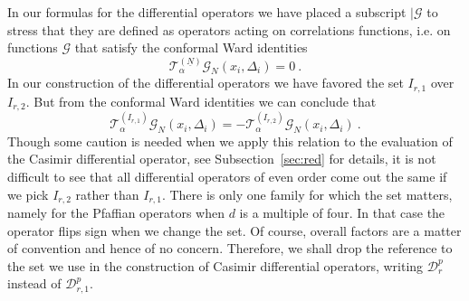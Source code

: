 \documentclass{article}
\def\cG{\mathcal{G}}
\begin{document}
In our formulas for the differential operators we have placed a subscript $|\cG$ to stress 
that they are defined as operators acting on correlations functions, i.e. on functions $\cG$ 
that satisfy the conformal Ward identities
\begin{equation}\label{eq:ward}
\mathcal{T}^{(\underline{N})}_\alpha \mathcal{G}_N(x_i,\Delta_i) = 0 \  .      
\end{equation}
In our construction of the differential operators we have favored the set $I_{r,1}$ over 
$I_{r,2}$. But from the conformal Ward identities we can conclude that
$$ \mathcal{T}^{(I_{r,1})}_\alpha \cG_N(x_i,\Delta_i) =  - \mathcal{T}^{(I_{r,2})}_\alpha 
\cG_N(x_i,\Delta_i) \ . $$ 
Though some caution is needed when we apply this relation to the evaluation of the 
Casimir differential operator, see Subsection~\ref{sec:red} for details, it is not difficult to 
see that all differential operators of even order come out the same if we pick $I_{r,2}$
rather than $I_{r,1}$. There is only one family for which the set matters, namely for the 
Pfaffian operators when $d$ is a multiple of four. In that case the operator flips sign 
when we change the set. Of course, overall factors are a matter of convention and hence 
of no concern. Therefore, we shall drop the reference to the set we use in the 
construction of Casimir differential operators, writing $\mathcal{D}^p_{r}$ instead 
of $\mathcal{D}^p_{r,1}$. 
\end{document}
